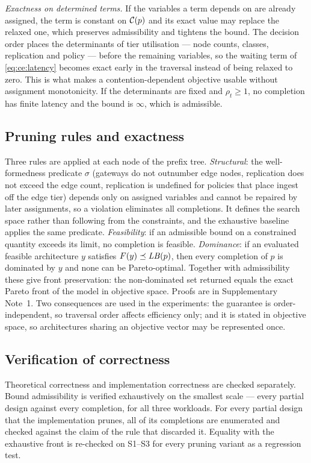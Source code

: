 \emph{Exactness on determined terms.} If the variables a term depends on are already
assigned, the term is constant on $\mathcal{C}(p)$ and its exact value may replace the relaxed
one, which preserves admissibility and tightens the bound. The decision order places the
determinants of tier utilisation --- node counts, classes, replication and policy ---
before the remaining variables, so the waiting term of \eqref{eq:ce:latency} becomes
exact early in the traversal instead of being relaxed to zero. This is what makes a
contention-dependent objective usable without assignment monotonicity. If the
determinants are fixed and $\rho_t\ge1$, no completion has finite latency and the bound
is $\infty$, which is admissible.

\subsection{Pruning rules and exactness}
Three rules are applied at each node of the prefix tree. \emph{Structural}: the
well-formedness predicate $\sigma$ (gateways do not outnumber edge nodes, replication
does not exceed the edge count, replication is undefined for policies that place ingest
off the edge tier) depends only on assigned variables and cannot be repaired by later
assignments, so a violation eliminates all completions. It defines the search space
rather than following from the constraints, and the exhaustive baseline applies the same
predicate. \emph{Feasibility}: if an admissible bound on a constrained quantity exceeds
its limit, no completion is feasible. \emph{Dominance}: if an evaluated feasible
architecture $y$ satisfies $F(y)\preceq \mathit{LB}(p)$, then every completion of $p$ is
dominated by $y$ and none can be Pareto-optimal. Together with admissibility these give
front preservation: the non-dominated set returned equals the exact Pareto front of the
model in objective space. Proofs are in Supplementary Note~1. Two consequences are used
in the experiments: the guarantee is order-independent, so traversal order affects
efficiency only; and it is stated in objective space, so architectures sharing an
objective vector may be represented once.

\subsection{Verification of correctness}
Theoretical correctness and implementation correctness are checked separately. Bound
admissibility is verified exhaustively on the smallest scale --- every partial design
against every completion, for all three workloads. For every partial design that the
implementation prunes, all of its completions are enumerated and checked against the
claim of the rule that discarded it. Equality with the exhaustive front is re-checked on
S1--S3 for every pruning variant as a regression test.

